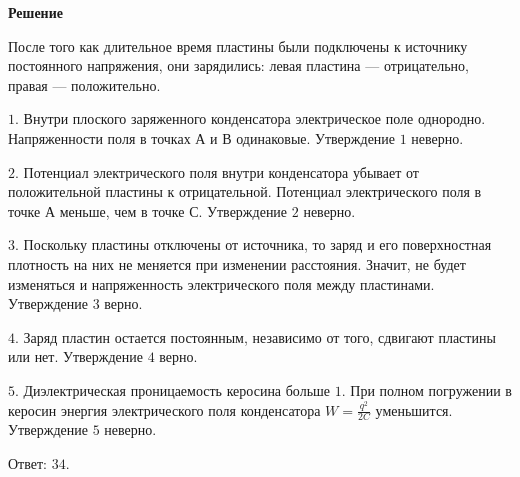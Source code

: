 \documentclass[12pt,a4paper]{article}
\begin{document}
{\begin{center}\end{center}
\par
}{
\smallskip\noindent\textbf{Решение}\par
После того как длительное время пластины были подключены к источнику постоянного напряжения, они зарядились: левая пластина — отрицательно, правая — положительно.\par
$1$. Внутри плоского заряженного конденсатора электрическое поле однородно. Напряженности поля в точках А и В одинаковые. Утверждение $1$ неверно.\par
$2$. Потенциал электрического поля внутри конденсатора убывает от положительной пластины к отрицательной. Потенциал электрического поля в точке А меньше, чем в точке С. Утверждение $2$ неверно.\par
$3$. Поскольку пластины отключены от источника, то заряд и его поверхностная плотность на них не меняется при изменении расстояния. Значит, не будет изменяться и напряженность электрического поля между пластинами. Утверждение $3$ верно.\par
$4$. Заряд пластин остается постоянным, независимо от того, сдвигают пластины или нет. Утверждение $4$ верно.\par
$5$. Диэлектрическая проницаемость керосина больше $1$. При полном погружении в керосин энергия электрического поля конденсатора $W= \frac{ q ^2 }{ 2C }$ уменьшится. Утверждение $5$ неверно.\par
Ответ: $34$.\par
}
\end{document}
